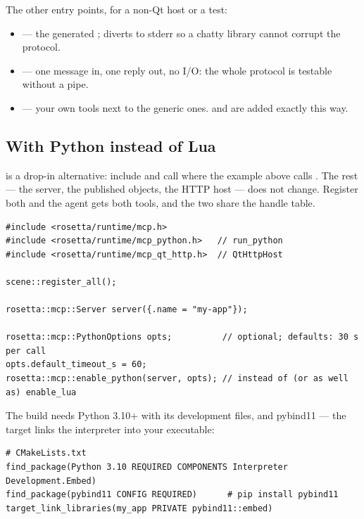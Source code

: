 The other entry points, for a non-Qt host or a test:

\begin{itemize}
  \item {} --- the generated ; diverts
     to stderr so a chatty library cannot corrupt the protocol.
  \item {} --- one message in, one reply out, no I/O:
    the whole protocol is testable without a pipe.
  \item {} --- your own tools next to the
    generic ones.  and  are added exactly
    this way.
\end{itemize}

\subsection*{With Python instead of Lua}

 is a drop-in alternative: include
 and call  where the
example above calls . The rest --- the server, the published
objects, the HTTP host --- does not change. Register both and the agent gets
both tools, and the two share the handle table.

\begin{lstlisting}[style=cpp]
#include <rosetta/runtime/mcp.h>
#include <rosetta/runtime/mcp_python.h>   // run_python
#include <rosetta/runtime/mcp_qt_http.h>  // QtHttpHost

scene::register_all();

rosetta::mcp::Server server({.name = "my-app"});

rosetta::mcp::PythonOptions opts;          // optional; defaults: 30 s per call
opts.default_timeout_s = 60;
rosetta::mcp::enable_python(server, opts); // instead of (or as well as) enable_lua
\end{lstlisting}

The build needs Python 3.10+ with its development files, and pybind11 --- the
 target links the interpreter into your executable:

\begin{lstlisting}[style=sh]
# CMakeLists.txt
find_package(Python 3.10 REQUIRED COMPONENTS Interpreter Development.Embed)
find_package(pybind11 CONFIG REQUIRED)      # pip install pybind11
target_link_libraries(my_app PRIVATE pybind11::embed)
\end{lstlisting}

